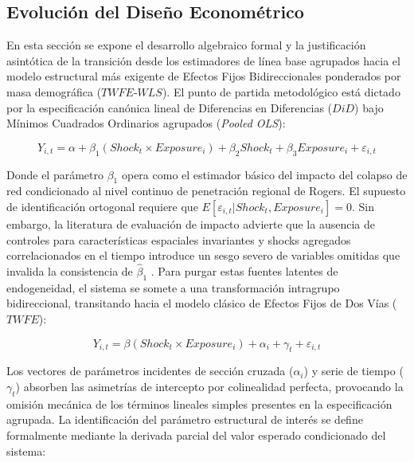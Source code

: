\subsection{Evoluci\'on del Dise\~no Econom\'etrico}
\label{sec:A_1}

En esta secci\'on se expone el desarrollo algebraico formal y la justificaci\'on asint\'otica de la transici\'on desde los estimadores de l\'inea base agrupados hacia el modelo estructural m\'as exigente de Efectos Fijos Bidireccionales ponderados por masa demogr\'afica ($TWFE\text{-}WLS$). El punto de partida metodol\'ogico est\'a dictado por la especificaci\'on can\'onica lineal de Diferencias en Diferencias ($DiD$) bajo M\'inimos Cuadrados Ordinarios agrupados (\textit{Pooled OLS}):

\begin{equation}
    Y_{i,t} = \alpha + \beta_1 \left( Shock_t \times Exposure_i \right) + \beta_2 Shock_t + \beta_3 Exposure_i + \varepsilon_{i,t}
\end{equation}

Donde el par\'ametro $\beta_1$ opera como el estimador b\'asico del impacto del colapso de red condicionado al nivel continuo de penetraci\'on regional de Rogers. El supuesto de identificaci\'on ortogonal requiere que $\textit{$E$}[\varepsilon_{i,t} | Shock_t, Exposure_i] = 0$. Sin embargo, la literatura de evaluaci\'on de impacto advierte que la ausencia de controles para caracter\'isticas espaciales invariantes y shocks agregados correlacionados en el tiempo introduce un sesgo severo de variables omitidas que invalida la consistencia de $\hat{\beta}_1$ \citep{goodman2021difference, meyer1995natural}. Para purgar estas fuentes latentes de endogeneidad, el sistema se somete a una transformaci\'on intragrupo bidireccional, transitando hacia el modelo cl\'asico de Efectos Fijos de Dos V\'ias ($TWFE$):

\begin{equation}
    Y_{i,t} = \beta \left( Shock_t \times Exposure_i \right) + \alpha_i + \gamma_t + \varepsilon_{i,t}
\end{equation}

Los vectores de par\'ametros incidentes de secci\'on cruzada ($\alpha_i$) y serie de tiempo ($\gamma_t$) absorben las asimetr\'ias de intercepto por colinealidad perfecta, provocando la omisi\'on mec\'anica de los t\'erminos lineales simples presentes en la especificaci\'on agrupada. La identificaci\'on del par\'ametro estructural de inter\'es se define formalmente mediante la derivada parcial del valor esperado condicionado del sistema:

